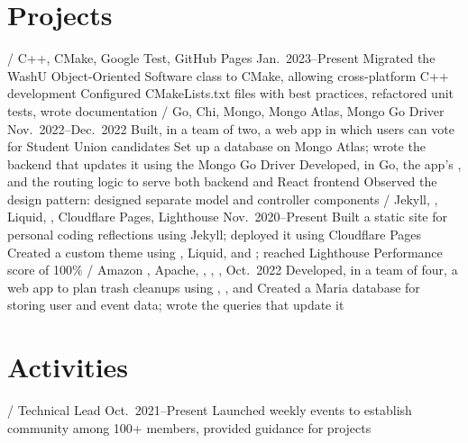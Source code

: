 \section{Projects}
\begin{outline}
     / C++, CMake, Google Test, GitHub Pages
    \hfill Jan.\ 2023--Present
        \1 Migrated the WashU Object-Oriented Software class to CMake, allowing cross-platform C++ development
            \2 Configured CMakeLists.txt files with best practices, refactored unit tests, wrote documentation
     / Go, Chi, Mongo, Mongo Atlas, Mongo Go Driver
    \hfill Nov.\ 2022--Dec.\ 2022
        \1 Built, in a team of two, a web app in which users can vote for Student Union candidates
            \2 Set up a database on Mongo Atlas; wrote the backend that updates it using the Mongo Go Driver
            \2 Developed, in Go, the app's  , and the routing logic to serve both backend and React frontend
            \2 Observed the  design pattern: designed separate model and controller components
     / Jekyll, , Liquid, , Cloudflare Pages, Lighthouse
    \hfill Nov.\ 2020--Present
        \1 Built a static site for personal coding reflections using Jekyll; deployed it using Cloudflare Pages
            \2 Created a custom theme using , Liquid, and ; reached Lighthouse Performance score of 100\%
     / Amazon , Apache, , , , 
    \hfill Oct.\ 2022
        \1 Developed, in a team of four, a web app to plan trash cleanups using , , and 
            \2 Created a Maria database for storing user and event data; wrote the  queries that update it
\end{outline}

\section{Activities}
\begin{outline}
     / Technical Lead
    \hfill Oct.\ 2021--Present
        \1 Launched weekly events to establish community among 100+ members, provided guidance for  projects
\end{outline}
